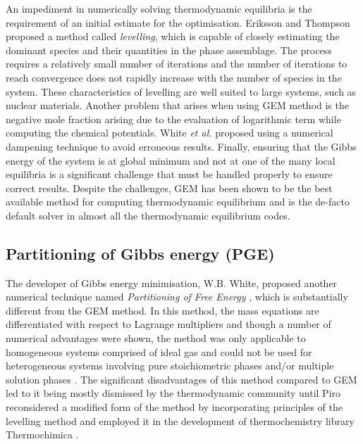 	An impediment in numerically solving thermodynamic equilibria is the requirement of an initial estimate for the optimisation. Eriksson and Thompson \cite{Eriksson89} proposed a method called \emph{levelling}, which is capable of closely estimating the dominant species and their quantities in the phase assemblage. The process requires a relatively small number of iterations and the number of iterations to reach convergence does not rapidly increase with the number of species in the system. These characteristics of levelling are well suited to large systems, such as nuclear materials. Another problem that arises when using GEM method is the negative mole fraction arising due to the evaluation of logarithmic term while computing the chemical potentials. White \textit{et al.} proposed using a numerical dampening technique to avoid erroneous results. Finally, ensuring that the Gibbs energy of the system is at global minimum and not at one of the many local equilibria is a significant challenge that must be handled properly to ensure correct results. Despite the challenges, GEM has been shown to be the best available method for computing thermodynamic equilibrium and is the de-facto default solver in almost all the thermodynamic equilibrium codes.

	\subsection{Partitioning of Gibbs energy (PGE)}
	The developer of Gibbs energy minimisation, W.B. White, proposed another numerical technique named \emph{Partitioning of Free Energy}  \cite{White67}, which is substantially different from the GEM method. In this method, the mass equations are differentiated with respect to Lagrange multipliers and though a number of numerical advantages were shown, the method was only applicable to homogeneous systems comprised of ideal gas and could not be used for heterogeneous systems involving pure stoichiometric phases and/or multiple solution phases \cite{White67,vanZeggeren11}. The significant disadvantages of this method compared to GEM led to it being mostly dismissed by the thermodynamic community until Piro \cite{Piro11b} reconsidered a modified form of the method by incorporating principles of the levelling method and employed it in the development of thermochemistry library {Thermochimica} \cite{Piro13}.

